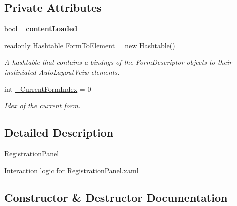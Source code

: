 \subsection*{Private Attributes}
\begin{DoxyCompactItemize}
\item 
\mbox{\label{class_wpf_handler_1_1_u_i_1_1_controls_1_1_logon_1_1_registration_panel_a952c9b5d4435669a5f3446869e8e004c}} 
bool {\bfseries \+\_\+content\+Loaded}
\item 
readonly Hashtable \mbox{\hyperlink{class_wpf_handler_1_1_u_i_1_1_controls_1_1_logon_1_1_registration_panel_ae620351878cf6ccd4775d5af277a0542}{Form\+To\+Element}} = new Hashtable()
\begin{DoxyCompactList}\small\item\em A hashtable that contains a bindngs of the Form\+Descriptor objects to their instiniated Auto\+Layout\+Veiw elements. \end{DoxyCompactList}\item 
int \mbox{\hyperlink{class_wpf_handler_1_1_u_i_1_1_controls_1_1_logon_1_1_registration_panel_a6c9450ade16af883e6d2f0801713ebc6}{\+\_\+\+Current\+Form\+Index}} = 0
\begin{DoxyCompactList}\small\item\em Idex of the current form. \end{DoxyCompactList}\end{DoxyCompactItemize}


\subsection{Detailed Description}
\mbox{\hyperlink{class_wpf_handler_1_1_u_i_1_1_controls_1_1_logon_1_1_registration_panel}{Registration\+Panel}} 

Interaction logic for Registration\+Panel.\+xaml 

\subsection{Constructor \& Destructor Documentation}
\mbox{\label{class_wpf_handler_1_1_u_i_1_1_controls_1_1_logon_1_1_registration_panel_a51c83efa00ed6ca56e65be059adc76b8}} 
